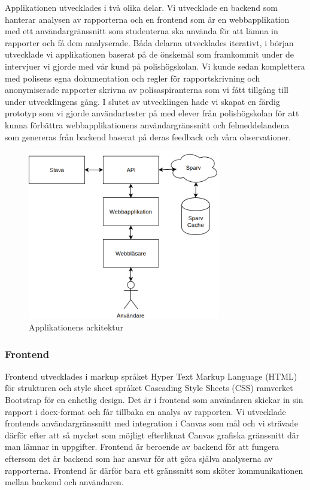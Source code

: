 \documentclass[swedish]{maucsthesis}
\begin{document}
Applikationen utvecklades i två olika delar. Vi utvecklade en backend som hanterar
analysen av rapporterna och en frontend som är en webbapplikation med ett
användargränssnitt som studenterna ska använda för att lämna in
rapporter och få dem analyserade. Båda delarna utvecklades iterativt, i
början utvecklade vi applikationen baserat på de önskemål som framkommit under
de intervjuer vi gjorde med vår kund på polishögskolan. Vi kunde sedan komplettera
med polisens egna dokumentation och regler för rapportskrivning och
anonymiserade rapporter skrivna av polisaspiranterna som vi fått tillgång till
under utvecklingens gång. I slutet av utvecklingen hade vi skapat en färdig
prototyp som vi gjorde användartester på med elever från polishögskolan för att
kunna förbättra webbapplikationens användargränssnitt och felmeddelandena som
genereras från backend baserat på deras feedback och våra observationer.

\begin{figure}[H]
    \centering
    \includegraphics[width=0.75\textwidth]{architecture.png}
    \caption{Applikationens arkitektur}
    \label{fig:architecture}
\end{figure}

\subsubsection{Frontend}

Frontend utvecklades i markup språket Hyper Text Markup Language (HTML) för
strukturen och style sheet språket Cascading Style Sheets (CSS) ramverket
Bootstrap för en enhetlig design. Det är i frontend som användaren skickar in
sin rapport i docx-format och får tillbaka en analys av rapporten. Vi utvecklade
frontends användargränssnitt med integration i Canvas som mål och vi strävade
därför efter att så mycket som möjligt efterliknat Canvas grafiska gränssnitt
där man lämnar in uppgifter. Frontend är beroende av backend för att fungera
eftersom det är backend som har ansvar för att göra själva analyserna av
rapporterna. Frontend är därför bara ett gränssnitt som sköter kommunikationen
mellan backend och användaren.
\end{document}
